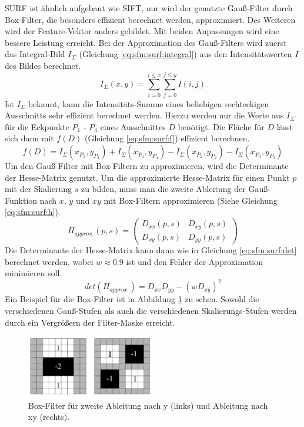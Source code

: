 \documentclass[12pt,titlepage, twoside]{article}
\begin{document}
SURF \cite{SURF} ist ähnlich aufgebaut wie SIFT, nur wird der genutzte Gauß-Filter durch Box-Filter, die besonders effizient berechnet werden, approximiert.
Des Weiteren wird der Feature-Vektor anders gebildet. Mit beiden Anpassungen wird eine bessere Leistung erreicht.
Bei der Approximation des Gauß-Filters wird zuerst das Integral-Bild $I_\Sigma$ (Gleichung \ref{eq:sfm:surf:integral}) aus den Intensitätswerten $I$ des Bildes berechnet.
\begin{equation}
    \label{eq:sfm:surf:integral}
    I_\Sigma (x,y) = \sum_{i=0}^{i\leq x}\sum_{j=0}^{j\leq y}I(i,j)
\end{equation}
Ist $I_\Sigma$ bekannt, kann die Intensitäts-Summe eines beliebigen rechteckigen Ausschnitts sehr effizient berechnet werden. 
Hierzu werden nur die Werte aus $I_\Sigma$ für die Eckpunkte $P_1$ - $P_4$ eines Ausschnittes $D$ benötigt.
Die Fläche für $D$ lässt sich dann mit $f(D)$ (Gleichung \ref{eq:sfm:surf:f}) effizient berechnen.
\begin{equation}
    \label{eq:sfm:surf:f}
    f(D) = I_\Sigma(x_{P_1}, y_{P_1}) + I_\Sigma(x_{P_4}, y_{P_4}) - I_\Sigma(x_{P_2}, y_{P_2}) - I_\Sigma(x_{P_3}, y_{P_3})
\end{equation}
Um den Gauß-Filter mit Box-Filtern zu approximieren, wird die Determinante der Hesse-Matrix genutzt. 
Um die approximierte Hesse-Matrix für einen Punkt $p$ mit der Skalierung $s$ zu bilden, muss man die zweite Ableitung der Gauß-Funktion nach $x$, $y$ und $xy$ mit Box-Filtern approximieren (Siehe Gleichung \ref{eq:sfm:surf:h}).
\begin{equation}
    \label{eq:sfm:surf:h}
    H_{approx.}(p,s) = \left( \begin{smallmatrix} D_{xx}(p,s)&D_{xy}(p,s)\\ D_{xy}(p,s)&D_{yy}(p,s) \end{smallmatrix} \right)
\end{equation}
Die Determinante der Hesse-Matrix kann dann wie in Gleichung \ref{eq:sfm:surf:det} berechnet werden, wobei $w\approx 0.9$ ist und den Fehler der Approximation minimieren soll.
\begin{equation}
    \label{eq:sfm:surf:det}
    det(H_{approx.}) = D_{xx}D_{yy}-(wD_{xy})^2
\end{equation}
Ein Beispiel für die Box-Filter ist in Abbildung \ref{fig:surf:filter} zu sehen. Sowohl die verschiedenen Gauß-Stufen als auch die verschiedenen Skalierungs-Stufen werden durch ein Vergrößern der Filter-Maske erreicht.
\begin{figure}
    \centering
    \includegraphics[width=0.5\textwidth]{./Images/SURF_BoxFilter.png}
    \caption{Box-Filter für zweite Ableitung nach y (links) und Ableitung nach xy (rechts). \cite{SURF}}
    \label{fig:surf:filter}
\end{figure}
\end{document}
